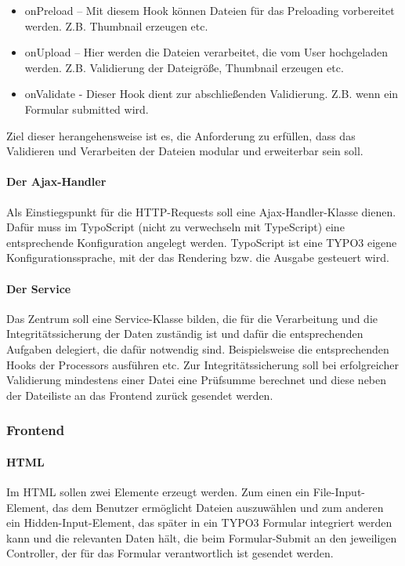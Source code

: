 \begin{itemize}
	\item onPreload 	– Mit diesem Hook können Dateien für das Preloading vorbereitet werden. Z.B. Thumbnail erzeugen etc.
	\item onUpload 		– Hier werden die Dateien verarbeitet, die vom User hochgeladen werden. Z.B. Validierung der Dateigröße, Thumbnail erzeugen etc.
	\item onValidate	- Dieser Hook dient zur abschließenden Validierung. Z.B. wenn ein Formular submitted wird.
\end{itemize}

Ziel dieser herangehensweise ist es, die Anforderung zu erfüllen, dass das Validieren und Verarbeiten der Dateien modular und erweiterbar sein soll.

\paragraph{Der Ajax-Handler} Als Einstiegspunkt für die HTTP-Requests soll eine Ajax-Handler-Klasse dienen. Dafür muss im TypoScript (nicht zu verwechseln mit TypeScript) eine entsprechende Konfiguration angelegt werden. TypoScript ist eine TYPO3 eigene Konfigurationssprache, mit der das Rendering bzw. die Ausgabe gesteuert wird.

\paragraph{Der Service} Das Zentrum soll eine Service-Klasse bilden, die für die Verarbeitung und die Integritätssicherung der Daten zuständig ist und dafür die entsprechenden Aufgaben delegiert, die dafür notwendig sind. Beispielsweise die entsprechenden Hooks der Processors ausführen etc. Zur Integritätssicherung soll bei erfolgreicher Validierung mindestens einer Datei eine Prüfsumme berechnet und diese neben der Dateiliste an das Frontend zurück gesendet werden.

\subsubsection{Frontend}
\label{sec:Frontend}

\paragraph{HTML} Im HTML sollen zwei Elemente erzeugt werden. Zum einen ein File-Input-Element, das dem Benutzer ermöglicht Dateien auszuwählen und zum anderen ein Hidden-Input-Element, das später in ein TYPO3 Formular integriert werden kann und die relevanten Daten hält, die beim Formular-Submit an den jeweiligen Controller, der für das Formular verantwortlich ist gesendet werden. 

